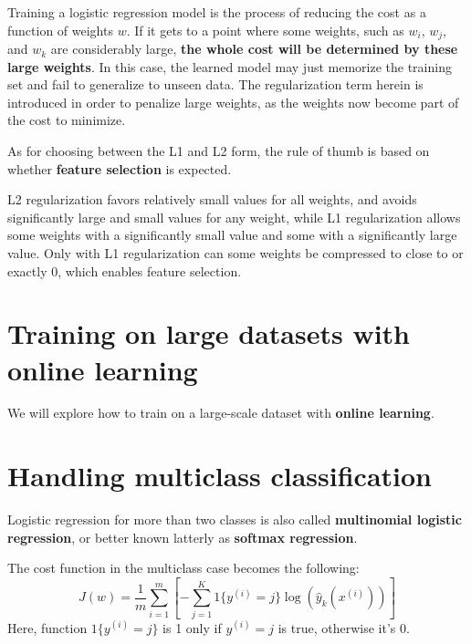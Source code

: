 Training a logistic regression model is the process of reducing the cost as a function of weights $w$. If it gets to a point where some weights, such as $w_i$, $w_j$, and $w_k$ are considerably large, \textbf{the whole cost will be determined by these large weights}. In this case, the learned model may just memorize the training set and fail to generalize to unseen data. The regularization term herein is introduced in order to penalize large weights, as the weights now become part of the cost to minimize.

As for choosing between the L1 and L2 form, the rule of thumb is based on whether \textbf{feature selection} is expected.

\begin{tcolorbox}
    L2 regularization favors relatively small values for all weights, and avoids significantly large and small values for any weight, while L1 regularization allows some weights with a significantly small value and some with a significantly large value. Only with L1 regularization can some weights be compressed to close to or exactly 0, which enables feature selection.
\end{tcolorbox}
\section{Training on large datasets with online learning}
We will explore how to train on a large-scale dataset with \textbf{online learning}.

\section{Handling multiclass classification}
Logistic regression for more than two classes is also called \textbf{multinomial logistic regression}, or better known latterly as \textbf{softmax regression}.

The cost function in the multiclass case becomes the following:
\begin{equation}
    J(w)=\frac{1}{m}\sum_{i=1}^{m}\left[-\sum_{j=1}^{K}1\{y^{(i)}=j\}\log(\hat{y}_k(x^{(i)}))\right]
\end{equation}
Here, function $1\{y^{(i)}=j\}$ is 1 only if $y^{(i)}=j$ is true, otherwise it's 0.